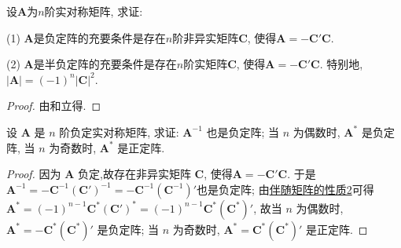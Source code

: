 \documentclass[../../main.tex]{subfiles}%
\begin{document}
\begin{proposition}
设$\boldsymbol{A}$为$n$阶实对称矩阵, 求证:

(1) $\boldsymbol{A}$是负定阵的充要条件是存在$n$阶非异实矩阵$\boldsymbol{C}$, 使得$\boldsymbol{A}=-\boldsymbol{C}'\boldsymbol{C}$.

(2) $\boldsymbol{A}$是半负定阵的充要条件是存在$n$阶实矩阵$\boldsymbol{C}$, 使得$\boldsymbol{A}=-\boldsymbol{C}'\boldsymbol{C}$. 特别地, $|\boldsymbol{A}| = (-1)^n|\boldsymbol{C}|^2$.
\end{proposition}
\begin{proof}

由和立得.

\end{proof}

\begin{proposition}\label{proposition:负定阵的相关性质}
设 \(\boldsymbol{A}\) 是 \(n\) 阶负定实对称矩阵, 求证: \(\boldsymbol{A}^{-1}\) 也是负定阵; 当 \(n\) 为偶数时, \(\boldsymbol{A}^*\) 是负定阵, 当 \(n\) 为奇数时, \(\boldsymbol{A}^*\) 是正定阵.
\end{proposition}
\begin{proof}

因为 \(\boldsymbol{A}\) 负定,故存在非异实矩阵 \(\boldsymbol{C}\), 使得\(\boldsymbol{A}=-\boldsymbol{C}'\boldsymbol{C}\). 于是 \(\boldsymbol{A}^{-1}=-\boldsymbol{C}^{-1}(\boldsymbol{C}')^{-1}=-\boldsymbol{C}^{-1}(\boldsymbol{C}^{-1})'\)也是负定阵; 由\hyperref[proposition:伴随矩阵的性质]{伴随矩阵的性质2}可得 \(\boldsymbol{A}^*=(-1)^{n - 1}\boldsymbol{C}^*(\boldsymbol{C}')^*=(-1)^{n - 1}\boldsymbol{C}^*(\boldsymbol{C}^*)'\), 故当 \(n\) 为偶数时, \(\boldsymbol{A}^*=-\boldsymbol{C}^*(\boldsymbol{C}^*)'\) 是负定阵; 当 \(n\) 为奇数时, \(\boldsymbol{A}^*=\boldsymbol{C}^*(\boldsymbol{C}^*)'\) 是正定阵.

\end{proof}
\end{document}
